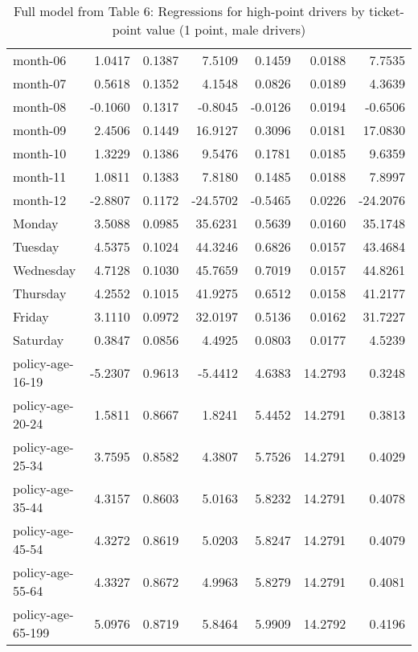 \documentclass[10pt]{article}
\begin{document}
\begin{table}[ht]
\begin{tabular}{lrrrrrr}
  month-06 & 1.0417 & 0.1387 & 7.5109 & 0.1459 & 0.0188 & 7.7535 \\ 
  month-07 & 0.5618 & 0.1352 & 4.1548 & 0.0826 & 0.0189 & 4.3639 \\ 
  month-08 & -0.1060 & 0.1317 & -0.8045 & -0.0126 & 0.0194 & -0.6506 \\ 
  month-09 & 2.4506 & 0.1449 & 16.9127 & 0.3096 & 0.0181 & 17.0830 \\ 
  month-10 & 1.3229 & 0.1386 & 9.5476 & 0.1781 & 0.0185 & 9.6359 \\ 
  month-11 & 1.0811 & 0.1383 & 7.8180 & 0.1485 & 0.0188 & 7.8997 \\ 
  month-12 & -2.8807 & 0.1172 & -24.5702 & -0.5465 & 0.0226 & -24.2076 \\ 
  Monday & 3.5088 & 0.0985 & 35.6231 & 0.5639 & 0.0160 & 35.1748 \\ 
  Tuesday & 4.5375 & 0.1024 & 44.3246 & 0.6826 & 0.0157 & 43.4684 \\ 
  Wednesday & 4.7128 & 0.1030 & 45.7659 & 0.7019 & 0.0157 & 44.8261 \\ 
  Thursday & 4.2552 & 0.1015 & 41.9275 & 0.6512 & 0.0158 & 41.2177 \\ 
  Friday & 3.1110 & 0.0972 & 32.0197 & 0.5136 & 0.0162 & 31.7227 \\ 
  Saturday & 0.3847 & 0.0856 & 4.4925 & 0.0803 & 0.0177 & 4.5239 \\ 
  policy-age-16-19 & -5.2307 & 0.9613 & -5.4412 & 4.6383 & 14.2793 & 0.3248 \\ 
  policy-age-20-24 & 1.5811 & 0.8667 & 1.8241 & 5.4452 & 14.2791 & 0.3813 \\ 
  policy-age-25-34 & 3.7595 & 0.8582 & 4.3807 & 5.7526 & 14.2791 & 0.4029 \\ 
  policy-age-35-44 & 4.3157 & 0.8603 & 5.0163 & 5.8232 & 14.2791 & 0.4078 \\ 
  policy-age-45-54 & 4.3272 & 0.8619 & 5.0203 & 5.8247 & 14.2791 & 0.4079 \\ 
  policy-age-55-64 & 4.3327 & 0.8672 & 4.9963 & 5.8279 & 14.2791 & 0.4081 \\ 
  policy-age-65-199 & 5.0976 & 0.8719 & 5.8464 & 5.9909 & 14.2792 & 0.4196 \\ 
   \hline
\end{tabular}
\caption{Full model from Table 6: Regressions for high-point drivers by ticket-point value (1 point, male drivers)} 
\label{tab_6_1_pts_M}
\end{table}


\clearpage
\pagebreak
\end{document}
